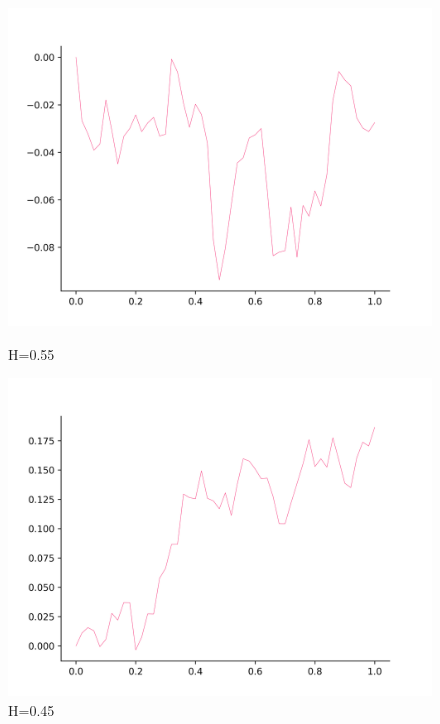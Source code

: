 \documentclass[a4paper,12pt]{article}
\numberwithin{equation}{section}
\begin{document}
	\begin{figure}[H]
		\includegraphics[scale=0.4]{mean-1-55.png}
		\caption{H=0.55}
		\endminipage\hfill
		\includegraphics[scale=0.4]{mean-1-45.png}
		\caption{H=0.45}
		\endminipage\hfill
	\end{figure}
	
\end{document}
